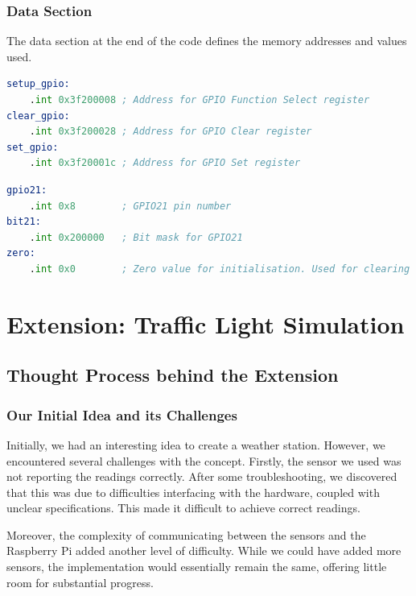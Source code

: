 \documentclass{article}
\begin{document}
\subsubsection{Data Section}
The data section at the end of the code defines the memory addresses and values used.\par\medskip 
\noindent
\begin{minipage}{0.45\textwidth}
\begin{lstlisting}[language=asm, caption=GPIO Setup]
setup_gpio:                     
    .int 0x3f200008 ; Address for GPIO Function Select register            
clear_gpio:                    
    .int 0x3f200028 ; Address for GPIO Clear register                             
set_gpio:                          
    .int 0x3f20001c ; Address for GPIO Set register                
\end{lstlisting}
\end{minipage}
\hfill
\begin{minipage}{0.45\textwidth}
\begin{lstlisting}[language=asm, caption=GPIO Constants]
gpio21:
    .int 0x8        ; GPIO21 pin number
bit21:
    .int 0x200000   ; Bit mask for GPIO21
zero:
    .int 0x0        ; Zero value for initialisation. Used for clearing registers before loop
\end{lstlisting}
\end{minipage}

\section{Extension: Traffic Light Simulation}
\subsection{Thought Process behind the Extension}
\subsubsection{Our Initial Idea and its Challenges}
Initially, we had an interesting idea to create a weather station. However, we encountered several challenges with the concept. Firstly, the sensor we used was not reporting the readings correctly. After some troubleshooting, we discovered that this was due to difficulties interfacing with the hardware, coupled with unclear specifications. This made it difficult to achieve correct readings.

Moreover, the complexity of communicating between the sensors and the Raspberry Pi added another level of difficulty. While we could have added more sensors, the implementation would essentially remain the same, offering little room for substantial progress.
\end{document}
